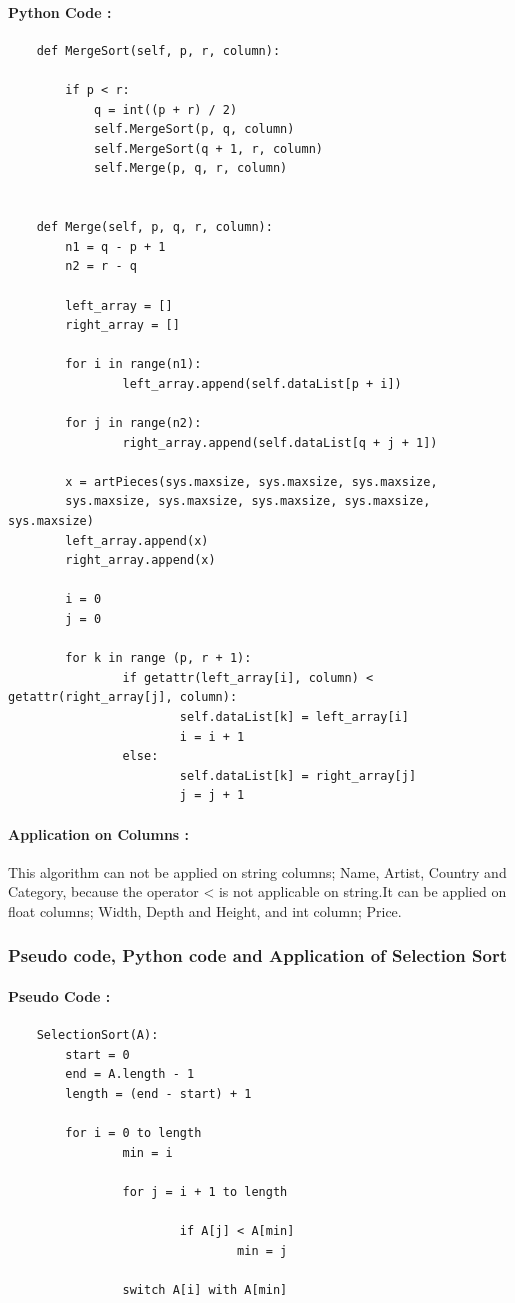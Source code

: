 \documentclass[12pt]{article}
\begin{document}
    \paragraph{Python Code :}
    \begin{verbatim}
    def MergeSort(self, p, r, column):
        
        if p < r:
            q = int((p + r) / 2)
            self.MergeSort(p, q, column)
            self.MergeSort(q + 1, r, column)
            self.Merge(p, q, r, column)
    
    
    def Merge(self, p, q, r, column):
        n1 = q - p + 1
        n2 = r - q

        left_array = []
        right_array = []
        
        for i in range(n1):
                left_array.append(self.dataList[p + i])

        for j in range(n2):
                right_array.append(self.dataList[q + j + 1])

        x = artPieces(sys.maxsize, sys.maxsize, sys.maxsize, 
        sys.maxsize, sys.maxsize, sys.maxsize, sys.maxsize, sys.maxsize)
        left_array.append(x)
        right_array.append(x)
        
        i = 0
        j = 0
        
        for k in range (p, r + 1):
                if getattr(left_array[i], column) < getattr(right_array[j], column):
                        self.dataList[k] = left_array[i]
                        i = i + 1
                else:
                        self.dataList[k] = right_array[j]
                        j = j + 1
    \end{verbatim}
    \paragraph{Application on Columns :}
    This algorithm can not be applied on string columns; Name, Artist, Country and Category, because the operator < is not applicable on string.It can be applied on float columns; Width, Depth and Height, and int column; Price.
    
    \newpage
    \subsubsection{Pseudo code, Python code and Application of Selection Sort}
    \paragraph{Pseudo Code :}
    \begin{verbatim}
    SelectionSort(A):
        start = 0
        end = A.length - 1
        length = (end - start) + 1
        
        for i = 0 to length
                min = i
                
                for j = i + 1 to length
                
                        if A[j] < A[min]
                                min = j
                                
                switch A[i] with A[min]
    \end{verbatim}
\end{document}
